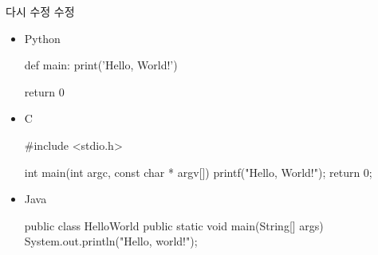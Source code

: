 다시 수정 수정 
\begin{itemize} 

\item{Python} 

\begin{Python} 
def main:
    print('Hello, World!')
    
    return 0
    
\end{Python} 

\item{C}


\begin{C} 
#include <stdio.h>

int main(int argc, const char * argv[]) 
{
    printf("Hello, World!\n");
    return 0;
}    
\end{C} 

\item{Java}

\begin{Java} 
public class HelloWorld {
    public static void main(String[] args) {
        System.out.println("Hello, world!");
    }
}
\end{Java} 

\end{itemize}

    

